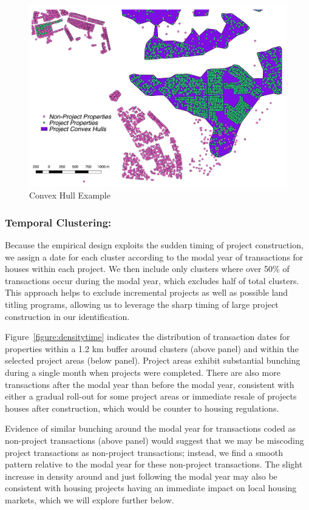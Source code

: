 \documentclass[12pt]{article}
\begin{document}
\begin{figure}
\caption{Convex Hull Example}\label{figure:conhull}
\centering
\includegraphics[scale=.5]{figures/convex_hull_v3_test.pdf}
\end{figure}

\subsubsection{Temporal Clustering:}  Because the empirical design exploits the sudden timing of project construction, we assign a date for each cluster according to the modal year of transactions for houses within each project.  We then include only clusters where over 50\% of transactions occur during the modal year, which excludes half of total clusters.  This approach helps to exclude incremental projects as well as possible land titling programs, allowing us to leverage the sharp timing of large project construction in our identification.  

Figure~\ref{figure:densitytime} indicates the distribution of transaction dates for properties within a 1.2 km buffer around clusters (above panel) and within the selected project areas (below panel).  Project areas exhibit substantial bunching during a single month when projects were completed.  There are also more transactions after the modal year than before the modal year, consistent with either a gradual roll-out for some project areas or immediate resale of projects houses after construction, which would be counter to housing regulations.  

Evidence of similar bunching around the modal year for transactions coded as non-project transactions (above panel) would suggest that we may be miscoding project transactions as non-project transactions; instead, we find a smooth pattern relative to the modal year for these non-project transactions.  The slight increase in density around and just following the modal year may also be consistent with housing projects having an immediate impact on local housing markets, which we will explore further below.
\end{document}
